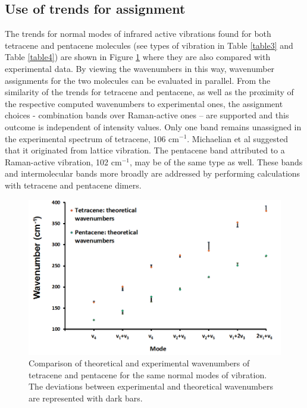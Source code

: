 \subsection*{Use of trends for assignment}

The trends for normal modes of infrared active vibrations found for both tetracene and pentacene molecules (see types of vibration in Table \ref{table3} and Table \ref{table4}) are shown in Figure \ref{figure4} where they are also compared with experimental data. By viewing the wavenumbers in this way, wavenumber assignments for the two molecules can be evaluated in parallel. From the similarity of the trends for tetracene and pentacene, as well as the proximity of the respective computed wavenumbers to experimental ones, the assignment choices - combination bands over Raman-active ones – are supported and this outcome is independent of intensity values. Only one band remains unassigned in the experimental spectrum of tetracene, 106 cm$^{-1}$. Michaelian et al \cite{michaelian2012far} suggested that it originated from lattice vibration. The pentacene band attributed to a Raman-active vibration, 102 cm$^{-1}$, may be of the same type as well.  These bands and intermolecular bands more broadly are addressed by performing calculations with tetracene and pentacene dimers. 

\begin{figure}[H]
	\centering
	\includegraphics[scale=0.6]{image/comparison}
	\caption[Comparison of theoretical and experimental wavenumbers of tetracene and pentacene]{Comparison of theoretical and experimental wavenumbers of tetracene and pentacene for the same normal modes of vibration. The deviations between experimental and theoretical wavenumbers are represented with dark bars.} \label{figure4}
\end{figure}

